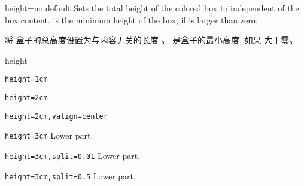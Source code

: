 
\begin{docTcbKey}{height}{=}{no default}
Sets the total height of the colored box to  independent
of the box content.  is the minimum height of the box, if
 is larger than zero.

将%
盒子的总高度设置为与内容无关的长度  。  是盒子的最小高度, 如果
 大于零。
\begin{exdispExample}{height}

\begin{tcolorbox}[height=1cm]
\verb|height=1cm|
\end{tcolorbox}
\begin{tcolorbox}[height=2cm]
\verb|height=2cm|
\end{tcolorbox}
\begin{tcolorbox}[height=2cm,valign=center]
\verb|height=2cm,valign=center|
\end{tcolorbox}

\begin{tcolorbox}[height=3cm]
\verb|height=3cm|
\tcblower
Lower part.
\end{tcolorbox}
\begin{tcolorbox}[height=3cm,split=0.01]
\verb|height=3cm,split=0.01|
\tcblower
Lower part.
\end{tcolorbox}
\begin{tcolorbox}[height=3cm,split=0.5]
\verb|height=3cm,split=0.5|
\tcblower
Lower part.
\end{tcolorbox}
\end{exdispExample}

\end{docTcbKey}